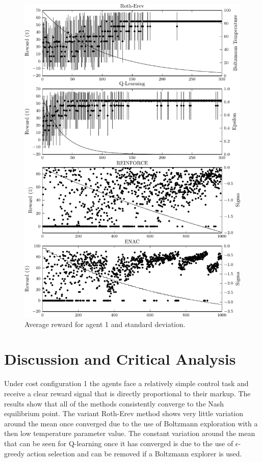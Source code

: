 {\begin{figure}
	  \includegraphics{figures/fig5_2_reward_a1}
	  \caption{Average reward for agent 1 and standard deviation.}
	  \label{fig:5_2_reward_a1}
	\end{figure}
}{}

\section{Discussion and Critical Analysis}
Under cost configuration 1 the agents face a relatively simple control task and
receive a clear reward signal that is directly proportional to their markup. The
results show that all of the methods consistently converge to the Nash
equilibrium point.  The variant Roth-Erev method shows very little variation
around the mean once converged due to the use of Boltzmann exploration with a
then low temperature parameter value.  The constant variation around the mean
that can be seen for Q-learning once it has converged is due to the use of
$\epsilon$-greedy action selection and can be removed if a Boltzmann explorer
is used.

